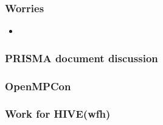 \begin{frame}[label= worries]
\frametitle{ Worries } 

\begin{itemize} 
\tiny \item \tiny 

\end{itemize} 

\end{frame} 

\begin{frame}[label=pdoc]  
\frametitle{ PRISMA document discussion}
\begin{outline}[enumerate]
\item \tiny 
\end{outline}
\end{frame}

\begin{frame}[label=pdoc]
\frametitle{ OpenMPCon } 

\begin{outline}[enumerate]

\end{outline}

\end{frame} 


\begin{frame} 
\frametitle{Work for HIVE(wfh)}



\end{frame} 